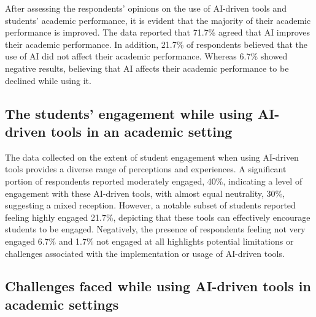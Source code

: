 After assessing the respondents' opinions on the use of AI-driven tools and students'
academic performance, it is evident that the majority of their academic performance is improved.
The data reported that 71.7\% agreed that AI improves their academic performance.
In addition, 21.7\% of respondents believed that the use of AI did not affect their
academic performance. Whereas 6.7\% showed negative results, believing
that AI affects their academic performance to be declined while using it.
\subsection{The students’ engagement while using AI-driven tools in an academic setting}


\begin{figure}[H]
	\centering
\end{figure}

The data collected on the extent of student engagement when using AI-driven
tools provides a diverse range of perceptions and experiences.
A significant portion of respondents reported moderately engaged, 40\%,
indicating a level of engagement with these AI-driven tools, with almost equal neutrality,
30\%, suggesting a mixed reception. However, a notable subset of students
reported feeling highly engaged 21.7\%, depicting that these tools can effectively
encourage students to be engaged.
Negatively, the presence of respondents feeling not very engaged 6.7\% and 1.7\% not
engaged at all highlights potential limitations or challenges associated with the
implementation or usage of AI-driven tools.

\subsection{Challenges faced while using AI-driven tools in academic settings}


